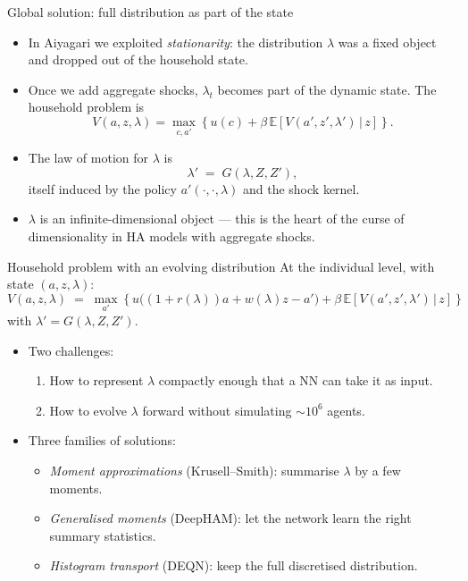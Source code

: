 \begin{frame}{Global solution: full distribution as part of the state}
\begin{itemize}
\item In Aiyagari we exploited \emph{stationarity}: the distribution $\lambda$ was a fixed object and dropped out of the household state.
\medskip
\item Once we add aggregate shocks, $\lambda_t$ becomes part of the dynamic state. The household problem is
\[
V(a, z, \lambda) = \max_{c,a'}\!\left\{u(c) + \beta\,\mathbb{E}\!\left[V(a', z', \lambda')\,|\,z\right]\right\}.
\]
\item The law of motion for $\lambda$ is
\[
\lambda' \;=\; G(\lambda, Z, Z'),
\]
itself induced by the policy $a'(\cdot, \cdot, \lambda)$ and the shock kernel.
\item $\lambda$ is an infinite-dimensional object --- this is the heart of the curse of dimensionality in HA models with aggregate shocks.
\end{itemize}
\end{frame}

\begin{frame}{Household problem with an evolving distribution}
At the individual level, with state $(a,z,\lambda)$:
\[
V(a,z,\lambda) \;=\; \max_{a'}\!\left\{u\!\big((1+r(\lambda))a + w(\lambda)z - a'\big) + \beta\,\mathbb{E}\!\left[V(a',z',\lambda')\,|\,z\right]\right\}
\]
with $\lambda' = G(\lambda, Z, Z')$.
\medskip
\begin{itemize}
\item Two challenges:
  \begin{enumerate}
  \item How to represent $\lambda$ compactly enough that a NN can take it as input.
  \item How to evolve $\lambda$ forward without simulating $\sim 10^6$ agents.
  \end{enumerate}
\medskip
\item Three families of solutions:
  \begin{itemize}
  \item \emph{Moment approximations} (Krusell--Smith): summarise $\lambda$ by a few moments.
  \item \emph{Generalised moments} (DeepHAM): let the network learn the right summary statistics.
  \item \emph{Histogram transport} (DEQN): keep the full discretised distribution.
  \end{itemize}
\end{itemize}
\end{frame}

